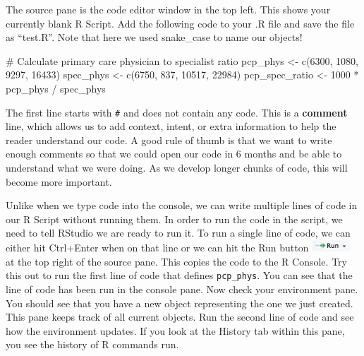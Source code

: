 \documentclass[
  letterpaper,
]{latex/krantz}
\makeatletter
\newenvironment{Shaded}{\begin{snugshade}}{\end{snugshade}}
\newcommand{\CommentTok}[1]{\textcolor[rgb]{0.37,0.37,0.37}{#1}}
\newcommand{\DecValTok}[1]{\textcolor[rgb]{0.68,0.00,0.00}{#1}}
\newcommand{\FunctionTok}[1]{\textcolor[rgb]{0.28,0.35,0.67}{#1}}
\newcommand{\NormalTok}[1]{\textcolor[rgb]{0.00,0.23,0.31}{#1}}
\newcommand{\OtherTok}[1]{\textcolor[rgb]{0.00,0.23,0.31}{#1}}
\newcommand{\SpecialCharTok}[1]{\textcolor[rgb]{0.37,0.37,0.37}{#1}}
\newenvironment{kframe}{%
\medskip{}
\setlength{\fboxsep}{.8em}
 \def\at@end@of@kframe{}%
 \ifinner\ifhmode%
  \def\at@end@of@kframe{\end{minipage}}%
  \begin{minipage}{\columnwidth}%
 \fi\fi%
 \def\FrameCommand##1{\hskip\@totalleftmargin \hskip-\fboxsep
 \colorbox{shadecolor}{##1}\hskip-\fboxsep
     \hskip-\linewidth \hskip-\@totalleftmargin \hskip\columnwidth}%
 \MakeFramed {\advance\hsize-\width
   \@totalleftmargin\z@ \linewidth\hsize
   \@setminipage}}%
 {\par\unskip\endMakeFramed%
 \at@end@of@kframe}
\renewenvironment{Shaded}{\begin{kframe}}{\end{kframe}}
\makeatother
\begin{document}
The source pane is the code editor window in the top left. This shows
your currently blank R Script. Add the following code to your .R file
and save the file as ``test.R''. Note that here we used snake\_case to
name our objects!

\begin{Shaded}
\begin{Highlighting}[]
\CommentTok{\# Calculate primary care physician to specialist ratio}
\NormalTok{pcp\_phys }\OtherTok{\textless{}{-}} \FunctionTok{c}\NormalTok{(}\DecValTok{6300}\NormalTok{, }\DecValTok{1080}\NormalTok{, }\DecValTok{9297}\NormalTok{, }\DecValTok{16433}\NormalTok{)}
\NormalTok{spec\_phys }\OtherTok{\textless{}{-}} \FunctionTok{c}\NormalTok{(}\DecValTok{6750}\NormalTok{, }\DecValTok{837}\NormalTok{, }\DecValTok{10517}\NormalTok{, }\DecValTok{22984}\NormalTok{)}
\NormalTok{pcp\_spec\_ratio }\OtherTok{\textless{}{-}} \DecValTok{1000} \SpecialCharTok{*}\NormalTok{ pcp\_phys }\SpecialCharTok{/}\NormalTok{ spec\_phys}
\end{Highlighting}
\end{Shaded}

The first line starts with \texttt{\#} and does not contain any code.
This is a \textbf{comment} line, which allows us to add
context, intent, or extra information to help the reader understand our
code. A good rule of thumb is that we want to write enough comments so
that we could open our code in 6 months and be able to understand what
we were doing. As we develop longer chunks of code, this will become
more important.

Unlike when we type code into the console, we can write multiple lines
of code in our R Script without running them. In order to run the code
in the script, we need to tell RStudio we are ready to run it. To run a
single line of code, we can either hit Ctrl+Enter when on that line or
we can hit the Run button
\includegraphics[width=0.55556in,height=\textheight]{book/images/intro_to_r/run-script.png}
at the top right of the source pane. This copies the code to the R
Console. Try this out to run the first line of code that defines
\texttt{pcp\_phys}. You can see that the line of code has been run in
the console pane. Now check your environment
pane. You should see that you have a
new object representing the one we just created. This pane keeps track
of all current objects. Run the second line of code and see how the
environment updates. If you look at the History tab within this pane,
you see the history of R commands run.
\end{document}
